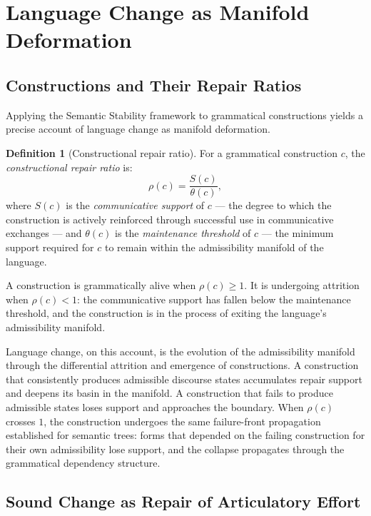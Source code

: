 \documentclass[11pt, a4paper]{article}
\theoremstyle{definition}
\newtheorem{definition}{Definition}
\theoremstyle{remark}
\begin{document}
\section{Language Change as Manifold Deformation}

\subsection{Constructions and Their Repair Ratios}

Applying the Semantic Stability framework to grammatical constructions yields
a precise account of language change as manifold deformation.

\begin{definition}[Constructional repair ratio]
For a grammatical construction $c$, the \textit{constructional repair ratio} is:
\[
\rho(c) = \frac{S(c)}{\theta(c)},
\]
where $S(c)$ is the \textit{communicative support} of $c$ --- the degree to
which the construction is actively reinforced through successful use in
communicative exchanges --- and $\theta(c)$ is the \textit{maintenance
threshold} of $c$ --- the minimum support required for $c$ to remain within
the admissibility manifold of the language.
\end{definition}

A construction is grammatically alive when $\rho(c) \geq 1$. It is undergoing
attrition when $\rho(c) < 1$: the communicative support has fallen below the
maintenance threshold, and the construction is in the process of exiting the
language's admissibility manifold.

Language change, on this account, is the evolution of the admissibility manifold
through the differential attrition and emergence of constructions. A construction
that consistently produces admissible discourse states accumulates repair support
and deepens its basin in the manifold. A construction that fails to produce
admissible states loses support and approaches the boundary. When $\rho(c)$
crosses $1$, the construction undergoes the same failure-front propagation
established for semantic trees: forms that depended on the failing construction
for their own admissibility lose support, and the collapse propagates through
the grammatical dependency structure.

\subsection{Sound Change as Repair of Articulatory Effort}
\end{document}
